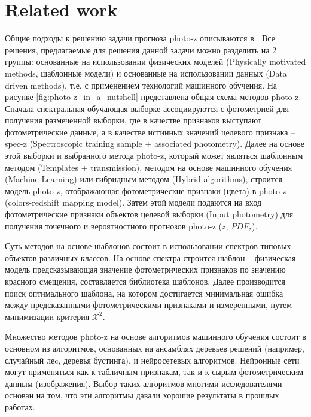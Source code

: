 \section{Related work}\label{sec:related_work}


Общие подходы к решению задачи прогноза photo-z описываются в \cite{bib:nature_photoz}. Все решения, предлагаемые для решения данной задачи можно разделить на 2 группы: основанные на использовании физических моделей (Physically motivated methods, шаблонные модели) и основанные на использовании данных (Data driven methods), т.е. с применением технологий машинного обучения. На рисунке \ref{fig:photo-z_in_a_nutshell} представлена общая схема методов photo-z. Сначала спектральная обучающая выборке ассоциируются с фотометрией для получения размеченной выборки, где в качестве признаков выступают фотометрические данные, а в качестве истинных значений целевого признака -- spec-z (Spectroscopic training sample + associated photometry). Далее на основе этой выборки и выбранного метода photo-z, который может являться шаблонным методом (Templates + transmission), методом на основе машинного обучения (Machine Learning) или гибридным методом (Hybrid algorithms), строится модель photo-z, отображающая фотометрические признаки (цвета) в photo-z (colors-redshift mapping model). Затем этой модели подаются на вход фотометрические признаки объектов целевой выборки (Input photometry) для получения точечного и вероятностного прогнозов photo-z (\(z\), \(PDF_z\)).

Суть методов на основе шаблонов состоит в использовании спектров типовых объектов различных классов. На основе спектра строится шаблон -- физическая модель предсказывающая значение фотометрических признаков по значению красного смещения, составляется библиотека шаблонов. Далее производится поиск оптимального шаблона, на котором достигается минимальная ошибка между предсказанными фотометрическими признаками и измеренными, путем минимизации критерия \(\mathcal{X}^2\).

Множество методов photo-z на основе алгоритмов машинного обучения состоит в основном из алгоритмов, основанных на ансамблях деревьев решений (например, случайный леc, деревья бустинга), и нейросетевых алгоритмов. Нейронные сети могут применяться как к табличным признакам, так и к сырым фотометрическим данным (изображения). Выбор таких алгоритмов многими исследователями основан на том, что эти алгоритмы давали хорошие результаты в прошлых работах.

